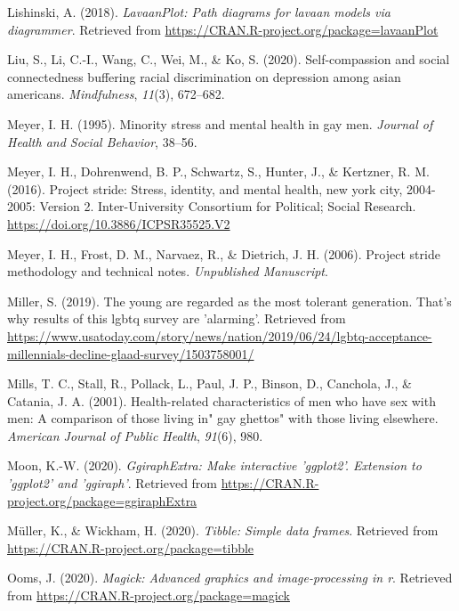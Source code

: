 \documentclass[
  english,
  man,floatsintext]{apa6}
\begin{document}
\leavevmode\hypertarget{ref-R-lavaanPlot}{}%
Lishinski, A. (2018). \emph{LavaanPlot: Path diagrams for lavaan models via diagrammer}. Retrieved from \url{https://CRAN.R-project.org/package=lavaanPlot}

\leavevmode\hypertarget{ref-liu2020}{}%
Liu, S., Li, C.-I., Wang, C., Wei, M., \& Ko, S. (2020). Self-compassion and social connectedness buffering racial discrimination on depression among asian americans. \emph{Mindfulness}, \emph{11}(3), 672--682.

\leavevmode\hypertarget{ref-meyer1995}{}%
Meyer, I. H. (1995). Minority stress and mental health in gay men. \emph{Journal of Health and Social Behavior}, 38--56.

\leavevmode\hypertarget{ref-projectstride}{}%
Meyer, I. H., Dohrenwend, B. P., Schwartz, S., Hunter, J., \& Kertzner, R. M. (2016). Project stride: Stress, identity, and mental health, new york city, 2004-2005: Version 2. Inter-University Consortium for Political; Social Research. \url{https://doi.org/10.3886/ICPSR35525.V2}

\leavevmode\hypertarget{ref-projectstridemethod}{}%
Meyer, I. H., Frost, D. M., Narvaez, R., \& Dietrich, J. H. (2006). Project stride methodology and technical notes. \emph{Unpublished Manuscript}.

\leavevmode\hypertarget{ref-Miller2019}{}%
Miller, S. (2019). The young are regarded as the most tolerant generation. That's why results of this lgbtq survey are 'alarming'. Retrieved from \url{https://www.usatoday.com/story/news/nation/2019/06/24/lgbtq-acceptance-millennials-decline-glaad-survey/1503758001/}

\leavevmode\hypertarget{ref-mills2001}{}%
Mills, T. C., Stall, R., Pollack, L., Paul, J. P., Binson, D., Canchola, J., \& Catania, J. A. (2001). Health-related characteristics of men who have sex with men: A comparison of those living in" gay ghettos" with those living elsewhere. \emph{American Journal of Public Health}, \emph{91}(6), 980.

\leavevmode\hypertarget{ref-R-ggiraphExtra}{}%
Moon, K.-W. (2020). \emph{GgiraphExtra: Make interactive 'ggplot2'. Extension to 'ggplot2' and 'ggiraph'}. Retrieved from \url{https://CRAN.R-project.org/package=ggiraphExtra}

\leavevmode\hypertarget{ref-R-tibble}{}%
Müller, K., \& Wickham, H. (2020). \emph{Tibble: Simple data frames}. Retrieved from \url{https://CRAN.R-project.org/package=tibble}

\leavevmode\hypertarget{ref-R-magick}{}%
Ooms, J. (2020). \emph{Magick: Advanced graphics and image-processing in r}. Retrieved from \url{https://CRAN.R-project.org/package=magick}
\end{document}
